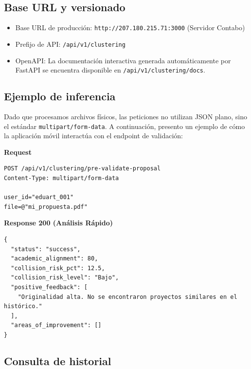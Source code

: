 

\subsection{Base URL y versionado}

\begin{itemize}
  \item Base URL de producción: \texttt{http://207.180.215.71:3000} (Servidor Contabo)
  \item Prefijo de API: \texttt{/api/v1/clustering}
  \item OpenAPI: La documentación interactiva generada automáticamente por FastAPI se encuentra disponible en \texttt{/api/v1/clustering/docs}.
\end{itemize}

\subsection{Ejemplo de inferencia}

Dado que procesamos archivos físicos, las peticiones no utilizan JSON plano, sino el estándar \texttt{multipart/form-data}. A continuación, presento un ejemplo de cómo la aplicación móvil interactúa con el endpoint de validación:

\textbf{Request}

\begin{lstlisting}[style=jsonstyle]
POST /api/v1/clustering/pre-validate-proposal
Content-Type: multipart/form-data

user_id="eduart_001"
file=@"mi_propuesta.pdf"
\end{lstlisting}

\textbf{Response 200 (Análisis Rápido)}

\begin{lstlisting}[style=jsonstyle]
{
  "status": "success",
  "academic_alignment": 80,
  "collision_risk_pct": 12.5,
  "collision_risk_level": "Bajo",
  "positive_feedback": [
    "Originalidad alta. No se encontraron proyectos similares en el histórico."
  ],
  "areas_of_improvement": []
}
\end{lstlisting}

\subsection{Consulta de historial}

